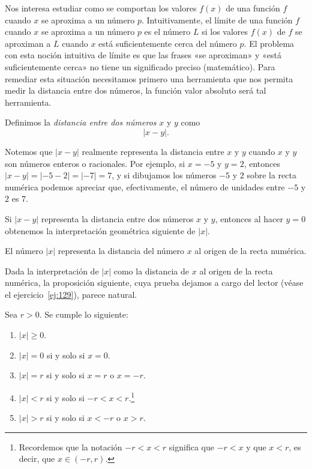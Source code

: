 \documentclass[12pt,a4paper]{book}
\begin{document}
    Nos interesa estudiar como se comportan los valores $f(x)$ de una función $f$
    cuando $x$ se aproxima a un número $p$. Intuitivamente, el límite de una función
    $f$ cuando $x$ se aproxima a un número $p$ es el número $L$ si los valores $f(x)$
    de $f$ se aproximan a $L$ cuando $x$ está suficientemente cerca del número $p$. El
    problema con esta noción intuitiva de límite es que las frases «se aproximan»
    y «está suficientemente cerca» no tiene un significado preciso (matemático).
    Para remediar esta situación necesitamos primero una herramienta que nos
    permita medir la distancia entre dos números, la función valor absoluto será
    tal herramienta.

    \begin{definicion}\label{def:27}
        Definimos la \textit{distancia
        entre dos números} $x$ y $y$ como
        \begin{equation*}
            |x-y|.
        \end{equation*}
    \end{definicion}

    Notemos que $|x-y|$ realmente representa la distancia entre $x$ y $y$ cuando
    $x$ y $y$ son números enteros o racionales. Por ejemplo, si $x=-5$ y $y=2$,
    entonces $|x-y|=|-5-2|=|-7|=7$, y si dibujamos los números $-5$ y $2$
    sobre la recta numérica podemos apreciar que, efectivamente, el número de
    unidades entre $-5$ y $2$ es $7$.

    Si $|x-y|$ representa la distancia entre dos números $x$ y $y$, entonces al hacer
    $y=0$ obtenemos la interpretación geométrica siguiente de $|x|$.

    \begin{observacion}[Interpretación de $|x|$]\label{obs:7}
        El número $|x|$ representa la
        distancia del número $x$ al origen de la recta numérica.
    \end{observacion}

    Dada la interpretación de $|x|$ como la distancia de $x$ al origen de la recta
    numérica, la proposición siguiente, cuya prueba dejamos a cargo del lector
    (véase el ejercicio~\ref{ej:129}), parece natural.

    \begin{proposicion}\label{prop:30}
        Sea $r>0$. Se cumple lo siguiente:
        \begin{enumerate}[nosep]
            \item $|x|\geq 0$.
            \item $|x|=0$ si y solo si $x=0$.
            \item $|x|=r$ si y solo si $x=r$ o $x=-r$.
            \item $|x|<r$ si y solo si $-r<x<r$.\footnote{Recordemos que la notación $-r<x<r$ significa que $-r<x$ y que $x<r$, es decir, que
            $x\in(-r,r)$.}
            \item $|x|>r$ si y solo si $x<-r$ o $x>r$.
        \end{enumerate}
    \end{proposicion}
\end{document}
